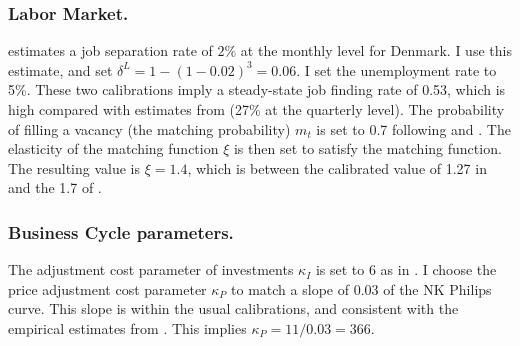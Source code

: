 \subsubsection{Labor Market.} \citet{hobijn2009job} estimates a job separation rate of $2\%$ at the monthly level for Denmark. I use this estimate, and set $\delta^L = 1- (1-0.02)^3 = 0.06$. I set the unemployment rate to 5\%. These two calibrations imply a steady-state job finding rate of 0.53, which is high compared with estimates from \citet{hobijn2009job} (27\% at the quarterly level). The probability of filling a vacancy (the matching probability) $m_t$ is set to 0.7 following \citet{den2000job} and \citet{ravenna2008vacancies}. The elasticity of the matching function $\xi$ is then set to satisfy the matching function. The resulting value is $\xi=1.4$, which is between the calibrated value of 1.27 in \citet{den2000job} and the 1.7 of \citet{gornemann2016doves}.  


\subsubsection{Business Cycle parameters.} The adjustment cost parameter of investments $\kappa_I$ is set to $6$ as in \citet{pedersen2013drives}. I choose the price adjustment cost parameter $\kappa_P$ to match a slope of 0.03 of the NK Philips curve. This slope is within the usual calibrations, and consistent with the empirical estimates from \citet{gali1999inflation}. This implies $\kappa_P = 11/0.03 = 366$. 



